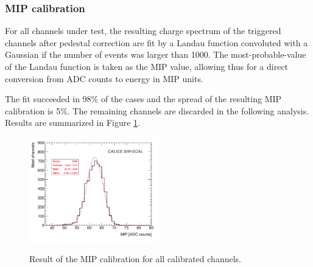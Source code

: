 \documentclass[final,3p,times,twocolumn]{elsarticle}
\begin{document}
\subsubsection{MIP calibration}
\label{sec:mip}

For all channels under test, the resulting charge spectrum of the triggered channels
after pedestal correction are fit by a Landau function convoluted with a Gaussian if the number of events was
larger than 1000. %
The most-probable-value of the Landau function is taken as the MIP value, allowing thus for a direct
conversion from ADC counts to energy in MIP units.


The fit succeeded in 98\% of the cases and the spread of the resulting MIP calibration is 5\%.
The remaining channels are discarded in the following analysis. Results are summarized in Figure \ref{mip}.


\begin{figure}[h!t]
  \centering
  \includegraphics[width=0.5\textwidth]{MIP_summary-eps-converted-to.pdf} \\
\caption{Result of the MIP calibration for all calibrated channels.}
\label{mip}
\end{figure}
\end{document}

